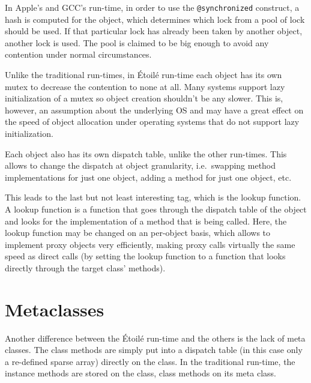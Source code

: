 In Apple's and GCC's run-time, in order to use the \verb=@synchronized= construct, a hash is computed for the object, which determines which lock from a pool of lock should be used. If that particular lock has already been taken by another object, another lock is used. The pool is claimed to be big enough to avoid any contention under normal circumstances. 

Unlike the traditional run-times, in \'Etoil\'e run-time each object has its own mutex to decrease the contention to none at all. Many systems support lazy initialization of a mutex so object creation shouldn't be any slower. This is, however, an assumption about the underlying OS and may have a great effect on the speed of object allocation under operating systems that do not support lazy initialization.

Each object also has its own dispatch table, unlike the other run-times. This allows to change the dispatch at object granularity, i.e.\ swapping method implementations for just one object, adding a method for just one object, etc.

This leads to the last but not least interesting tag, which is the lookup function. A lookup function is a function that goes through the dispatch table of the object and looks for the implementation of a method that is being called. Here, the lookup function may be changed on an per-object basis, which allows to implement proxy objects very efficiently, making proxy calls virtually the same speed as direct calls (by setting the lookup function to a function that looks directly through the target class' methods).

\section{Metaclasses}

Another difference between the \'Etoil\'e run-time and the others is the lack of meta classes. The class methods are simply put into a dispatch table (in this case only a re-defined sparse array) directly on the class. In the traditional run-time, the instance methods are stored on the class, class methods on its meta class.


